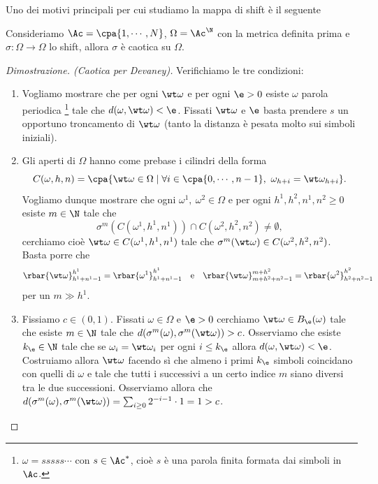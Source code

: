 Uno dei motivi principali per cui studiamo la mappa di shift \`e il seguente
\begin{proposition}\label{ShiftECaos}
Consideriamo $\Ac=\cpa{1,\cdots, N}$, $\Omega=\Ac^\N$ con la metrica definita prima e $\sigma:\Omega\to\Omega$ lo shift, allora $\sigma$ \`e caotica su $\Omega$.
\end{proposition}
\begin{proof}[Dimostrazione. (Caotica per Devaney)]
Verifichiamo le tre condizioni:
\begin{enumerate}
\item Vogliamo mostrare che per ogni $\wt \omega$ e per ogni $\e>0$ esiste $\omega$ parola periodica \footnote{$\omega=sssss\cdots$ con $s\in \Ac^\ast$, cio\`e $s$ \`e una parola finita formata dai simboli in $\Ac$.} tale che $d(\omega,\wt \omega)<\e$. Fissati $\wt \omega$ e $\e$ basta prendere $s$ un opportuno troncamento di $\wt \omega$ (tanto la distanza \`e pesata molto sui simboli iniziali).
\item Gli aperti di $\Omega$ hanno come prebase i cilindri della forma
\[C(\omega,h,n)=\cpa{\wt \omega\in\Omega\mid \forall i\in\cpa{0,\cdots,n-1},\ \omega_{h+i}=\wt \omega_{h+i}}.\]
Vogliamo dunque mostrare che ogni $\omega^1,\ \omega^2\in\Omega$ e per ogni $h^1,h^2,n^1,n^2\geq 0$ esiste $m\in\N$ tale che
\[\sigma^m(C(\omega^1,h^1,n^1))\cap C(\omega^2,h^2,n^2)\neq \emptyset,\]
cerchiamo cio\`e $\wt \omega\in C(\omega^1,h^1,n^1)$ tale che $\sigma^m(\wt \omega)\in C(\omega^2,h^2,n^2)$. Basta porre che 
\[\rbar{\wt\omega}_{h^1+n^1-1}^{h^1}=\rbar{\omega^1}_{h^1+n^1-1}^{h^1}\quad\text{e}\quad\rbar{\wt\omega}_{m+h^2+n^2-1}^{m+h^2}=\rbar{\omega^2}_{h^2+n^2-1}^{h^2}\]
per un $m\gg h^1$.
\item Fissiamo $c\in (0,1)$. Fissati $\omega\in\Omega$ e $\e>0$ cerchiamo $\wt \omega\in B_\e(\omega)$ tale che esiste $m\in\N$ tale che $d(\sigma^m(\omega),\sigma^m(\wt \omega))>c$. Osserviamo che esiste $k_\e\in\N$ tale che se $\omega_i=\wt \omega_i$ per ogni $i\leq k_\e$ allora $d(\omega,\wt \omega)<\e$. Costruiamo allora $\wt \omega$ facendo s\`i che almeno i primi $k_\e$ simboli coincidano con quelli di $\omega$ e tale che tutti i successivi a un certo indice $m$ siano diversi tra le due successioni. Osserviamo allora che $d(\sigma^m(\omega),\sigma^m(\wt \omega))=\sum_{i\geq 0}2^{-i-1}\cdot 1=1>c$.
\end{enumerate}
\end{proof}
